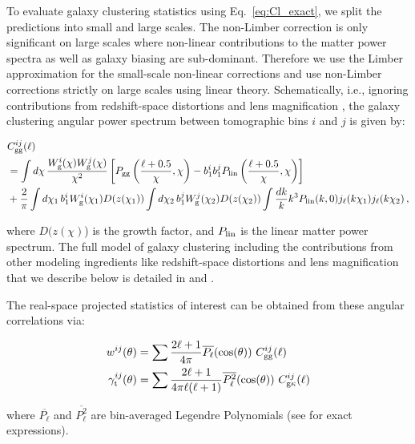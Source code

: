 \documentclass[aps, prd,twocolumn,superscriptaddress,nofootinbib,preprintnumbers]{revtex4-1}
\begin{document}
To evaluate galaxy clustering statistics using Eq.~\ref{eq:Cl_exact}, we split the predictions into small and large scales. The non-Limber correction is only significant on large scales where non-linear contributions to the matter power spectra as well as galaxy biasing are sub-dominant. Therefore we use the Limber approximation for the small-scale non-linear corrections and use non-Limber corrections strictly on large scales using linear theory. Schematically, i.e., ignoring contributions from redshift-space distortions and lens magnification \cite[see][for details]{y3-generalmethods}, the galaxy clustering angular power spectrum between tomographic bins $i$ and $j$ is given by:
\begin{widetext}
\begin{align}
    &C_{\rm gg}^{ij} (\ell) \nonumber\\
    &= \int d\chi\, \frac{W_{\rm g}^i(\chi)W_{\rm g}^j(\chi)}{\chi^2} \left[P_{\rm gg}\left(\frac{\ell+0.5}{\chi},\chi\right)- b_1^{i} b_1^{j} P_{\rm lin}\left(\frac{\ell+0.5}{\chi},\chi\right)\right]\nonumber\\
    &+\frac{2}{\pi}\int d\chi_1\,b_{1}^i W_{\rm g}^i(\chi_1) D(z(\chi_1))\int d\chi_2\,b_{1}^j W_{\rm g}^j(\chi_2)D(z(\chi_2)) \int\frac{dk}{k}k^3 P_{\rm lin}(k,0)j_\ell(k\chi_1)j_\ell(k\chi_2)\,,
\label{eq:Cl-DD_rewrite}
\end{align}
\end{widetext}

where $D(z(\chi)$) is the growth factor, and $P_{\rm lin}$ is the linear matter power spectrum. The full model of galaxy clustering including the contributions from other modeling ingredients like redshift-space distortions and lens magnification that we describe below is detailed in \cite{Fang_nonlimber} and \cite{y3-generalmethods}. 

The real-space projected statistics of interest can be obtained from these angular correlations via:
\begin{linenomath*}
\begin{align}\label{eq:2pt_exact}
    w^{ij}(\theta) &= \sum \frac{2\ell + 1}{4\pi} \overline{P_{\ell}}(\cos(\theta)) \ C^{ij}_{\rm gg}(\ell) \\
    \gamma_{\rm t}^{ij}(\theta) &= \sum \frac{2\ell + 1}{4\pi \ell (\ell + 1)} \overline{P_{\ell}^2}(\cos(\theta)) \ C^{ij}_{\rm g\kappa}(\ell)
\end{align}
\end{linenomath*}
where $\overline{P_{\ell}}$ and $\overline{P_{\ell}^2}$ are bin-averaged Legendre Polynomials (see \citet*{y3-covariances} for exact expressions). 
\end{document}
